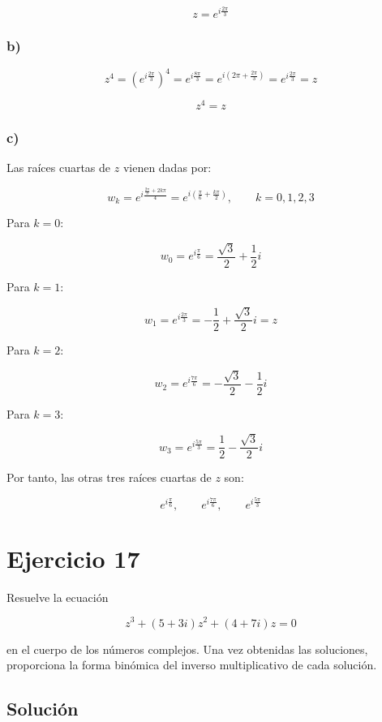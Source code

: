 \documentclass[fleqn]{article}
\begin{document}
		\[
		\boxed{
		z=e^{i\frac{2\pi}{3}}
		}
		\]

		\subsubsection*{b)}

		\[
		z^4
		=
		\left(e^{i\frac{2\pi}{3}}\right)^4
		=
		e^{i\frac{8\pi}{3}}
		=
		e^{i\left(2\pi+\frac{2\pi}{3}\right)}
		=
		e^{i\frac{2\pi}{3}}
		=
		z
		\]

		\[
		\boxed{
		z^4=z
		}
		\]

		\subsubsection*{c)}

		Las raíces cuartas de $z$ vienen dadas por:

		\[
		w_k
		=
		e^{i\frac{\frac{2\pi}{3}+2k\pi}{4}}
		=
		e^{i\left(\frac{\pi}{6}+\frac{k\pi}{2}\right)},
		\qquad
		k=0,1,2,3
		\]

		Para $k=0$:

		\[
		w_0
		=
		e^{i\frac{\pi}{6}}
		=
		\frac{\sqrt{3}}{2}+\frac{1}{2}i
		\]

		Para $k=1$:

		\[
		w_1
		=
		e^{i\frac{2\pi}{3}}
		=
		-\frac{1}{2}+\frac{\sqrt{3}}{2}i
		=
		z
		\]

		Para $k=2$:

		\[
		w_2
		=
		e^{i\frac{7\pi}{6}}
		=
		-\frac{\sqrt{3}}{2}-\frac{1}{2}i
		\]

		Para $k=3$:

		\[
		w_3
		=
		e^{i\frac{5\pi}{3}}
		=
		\frac{1}{2}-\frac{\sqrt{3}}{2}i
		\]

		Por tanto, las otras tres raíces cuartas de $z$ son:

		\[
		\boxed{
		e^{i\frac{\pi}{6}},
		\qquad
		e^{i\frac{7\pi}{6}},
		\qquad
		e^{i\frac{5\pi}{3}}
		}
		\]
	
	\section{Ejercicio 17}
		Resuelve la ecuación

		\[
		z^3+(5+3i)z^2+(4+7i)z=0
		\]

		en el cuerpo de los números complejos. Una vez obtenidas las soluciones, proporciona la forma binómica del inverso multiplicativo de cada solución.

		\subsection{Solución}
\end{document}
